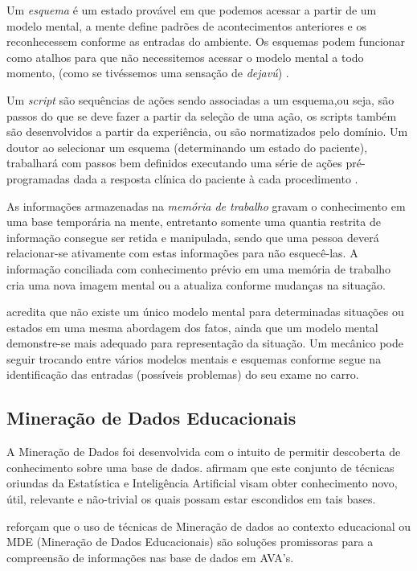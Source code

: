 \documentclass[12pt]{article}
\begin{document}
Um \textit{esquema} é um estado provável em que podemos acessar a partir de um modelo mental, a mente define padrões de acontecimentos anteriores e os reconhecessem conforme as entradas do ambiente. Os esquemas podem funcionar como atalhos para que não necessitemos acessar o modelo mental a todo momento, (como se tivéssemos uma sensação de \textit{dejavú}) \cite{Endsley2012}. 

Um \textit{script} são sequências de ações sendo associadas a um esquema,ou seja, são passos do que se deve fazer a partir da seleção de uma ação, os scripts também são desenvolvidos a partir da experiência, ou são normatizados pelo domínio. Um doutor ao selecionar um esquema (determinando um estado do paciente), trabalhará com passos bem definidos executando uma série de ações pré-programadas dada a resposta clínica do paciente à cada procedimento \cite{Endsley2012}. 

As informações armazenadas na \textit{memória de trabalho} gravam o conhecimento em uma base temporária na mente, entretanto somente uma quantia restrita de informação consegue ser retida e manipulada, sendo que uma pessoa deverá relacionar-se ativamente com estas informações para não esquecê-las. A informação conciliada com conhecimento prévio em uma memória de trabalho cria uma nova imagem mental ou a atualiza conforme mudanças na situação.
 	
\cite{Moreira1996} acredita que não existe um único modelo mental para determinadas situações ou estados em uma mesma abordagem dos fatos, ainda que um modelo mental demonstre-se mais adequado para representação da situação. Um mecânico pode seguir trocando entre vários modelos mentais e esquemas conforme segue na identificação das entradas (possíveis problemas) do seu exame no carro.

\subsection{Mineração de Dados Educacionais}

A Mineração de Dados foi desenvolvida com o intuito de permitir descoberta de conhecimento sobre uma base de dados. \cite{Goldschmidt_Passos_2005} afirmam que este conjunto de técnicas oriundas da Estatística e Inteligência Artificial visam obter conhecimento novo, útil, relevante e não-trivial os quais possam estar escondidos em tais bases.

\cite{Leite_et_al_2016} reforçam que o uso de técnicas de Mineração de dados ao contexto educacional ou MDE (Mineração de Dados Educacionais) são soluções promissoras para a compreensão de informações nas base de dados em AVA's.
\end{document}
